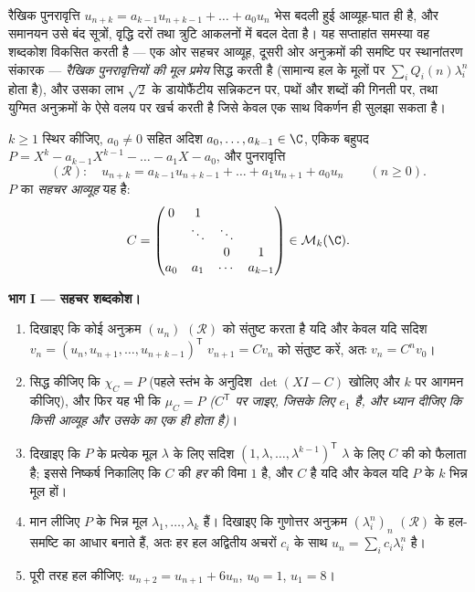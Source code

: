 रैखिक पुनरावृत्ति $u_{n+k} = a_{k-1}u_{n+k-1} + \dots + a_0 u_n$ भेस बदली हुई आव्यूह-घात ही है, और समानयन उसे बंद
सूत्रों, वृद्धि दरों तथा त्रुटि आकलनों में बदल देता है। यह सप्ताहांत
समस्या वह शब्दकोश विकसित करती है --- एक ओर सहचर आव्यूह, दूसरी ओर
अनुक्रमों की समष्टि पर स्थानांतरण संकारक --- \emph{रैखिक पुनरावृत्तियों
की मूल प्रमेय} सिद्ध करती है (सामान्य हल  के मूलों पर
$\sum_i Q_i(n)\lambda_i^n$ होता है), और उसका लाभ $\sqrt2$ के डायोफैंटीय सन्निकटन पर, पथों और
शब्दों की गिनती पर, तथा युग्मित अनुक्रमों के ऐसे वलय पर खर्च करती है
जिसे केवल एक साथ विकर्णन ही सुलझा सकता है।

\begin{problem}[{सप्ताहांत समस्या --- रैखिक पुनरावृत्तियों की
मूल प्रमेय}]
\label{pb:b2:reduction:1}
$k \geq 1$ स्थिर कीजिए, $a_0
\neq 0$ सहित अदिश $a_0, \dots, a_{k-1} \in \C$, एकिक बहुपद $P = X^k - a_{k-1}X^{k-1} - \dots -
a_1 X - a_0$, और पुनरावृत्ति
\[
(\mathcal R)\colon\quad u_{n+k} = a_{k-1}u_{n+k-1} + \dots +
a_1 u_{n+1} + a_0 u_n \qquad (n \geq 0).
\]
$P$ का \emph{सहचर आव्यूह} यह है:
\[
C =
\begin{pmatrix}
0 & 1 & & \\
 & \ddots & \ddots & \\
 & & 0 & 1\\
a_0 & a_1 & \cdots & a_{k-1}
\end{pmatrix}
\in \mathcal{M}_k(\C).
\]

\medskip
\noindent\textbf{भाग I --- सहचर शब्दकोश।}
\begin{enumerate}
  \item दिखाइए कि कोई अनुक्रम $(u_n)$ $(\mathcal R)$ को संतुष्ट करता है यदि और केवल
        यदि सदिश $v_n = (u_n, u_{n+1}, \dots,
        u_{n+k-1})^{\mathsf T}$ $v_{n+1} = Cv_n$ को संतुष्ट करें, अतः $v_n = C^n v_0$।
  \item सिद्ध कीजिए कि $\chi_C = P$ (पहले स्तंभ के अनुदिश $\det(XI - C)$ खोलिए और $k$ पर
        आगमन कीजिए), और फिर यह भी कि $\mu_C = P$ \emph{($C^{\mathsf T}$ पर जाइए, जिसके लिए
        $e_1$  है, और ध्यान दीजिए कि किसी आव्यूह और उसके 
        का  एक ही होता है)}।
  \item दिखाइए कि $P$ के प्रत्येक मूल $\lambda$ के लिए सदिश $(1, \lambda, \dots, \lambda^{k-1})^{\mathsf T}$ $\lambda$ के
        लिए $C$ की  को फैलाता है; इससे निष्कर्ष
        निकालिए कि $C$ की \emph{हर}  की विमा $1$ है,
        और $C$  है यदि और केवल यदि $P$ के $k$ भिन्न मूल
        हों।
  \item मान लीजिए $P$ के भिन्न मूल $\lambda_1, \dots,
        \lambda_k$ हैं। दिखाइए कि गुणोत्तर
        अनुक्रम $(\lambda_i^n)_n$ $(\mathcal R)$ के हल-समष्टि का आधार बनाते हैं, अतः हर हल
        अद्वितीय अचरों $c_i$ के साथ $u_n = \sum_i
        c_i\lambda_i^n$ है।
  \item पूरी तरह हल कीजिए: $u_{n+2} = u_{n+1} + 6u_n$, $u_0 = 1$, $u_1 = 8$।
\end{enumerate}


\end{problem}
